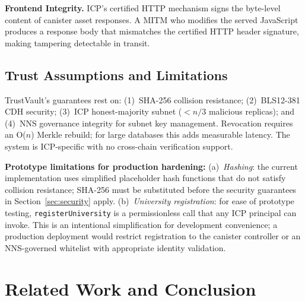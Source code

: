\documentclass[conference,a4paper]{IEEEtran}
\begin{document}
\textbf{Frontend Integrity.} ICP's certified HTTP mechanism signs the byte-level content of canister asset responses. A MITM who modifies the served JavaScript produces a response body that mismatches the certified HTTP header signature, making tampering detectable in transit.

\subsection{Trust Assumptions and Limitations}

TrustVault's guarantees rest on: (1)~SHA-256 collision resistance; (2)~BLS12-381 CDH security; (3)~ICP honest-majority subnet ($< n/3$ malicious replicas); and (4)~NNS governance integrity for subnet key management. Revocation requires an O($n$) Merkle rebuild; for large databases this adds measurable latency. The system is ICP-specific with no cross-chain verification support.

\textbf{Prototype limitations for production hardening:} (a)~\textit{Hashing}: the current implementation uses simplified placeholder hash functions that do not satisfy collision resistance; SHA-256 must be substituted before the security guarantees in Section~\ref{sec:security} apply. (b)~\textit{University registration}: for ease of prototype testing, \texttt{registerUniversity} is a permissionless call that any ICP principal can invoke. This is an intentional simplification for development convenience; a production deployment would restrict registration to the canister controller or an NNS-governed whitelist with appropriate identity validation.

\section{Related Work and Conclusion}
\label{sec:relconc}
\end{document}
